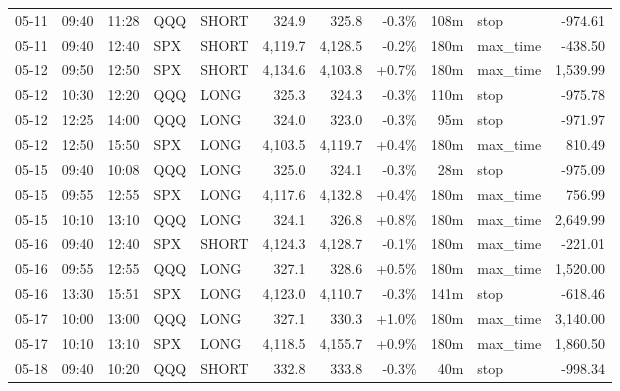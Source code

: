 \documentclass[11pt,a4paper,twoside]{article}
\begin{document}
\begin{center}
\begin{longtable}{>{\color{txtmain}}l l l l l r r r r >{\color{txtmain}}l r}
05-11 & 09:40 & 11:28 & QQQ & SHORT & 324.9 & 325.8 & \textcolor{lossred}{-0.3\%} & 108m & stop & \textcolor{lossred}{-974.61} \\
05-11 & 09:40 & 12:40 & SPX & SHORT & 4,119.7 & 4,128.5 & \textcolor{lossred}{-0.2\%} & 180m & max\_time & \textcolor{lossred}{-438.50} \\
05-12 & 09:50 & 12:50 & SPX & SHORT & 4,134.6 & 4,103.8 & \textcolor{wingreen}{+0.7\%} & 180m & max\_time & \textcolor{wingreen}{1,539.99} \\
05-12 & 10:30 & 12:20 & QQQ & LONG & 325.3 & 324.3 & \textcolor{lossred}{-0.3\%} & 110m & stop & \textcolor{lossred}{-975.78} \\
05-12 & 12:25 & 14:00 & QQQ & LONG & 324.0 & 323.0 & \textcolor{lossred}{-0.3\%} & 95m & stop & \textcolor{lossred}{-971.97} \\
05-12 & 12:50 & 15:50 & SPX & LONG & 4,103.5 & 4,119.7 & \textcolor{wingreen}{+0.4\%} & 180m & max\_time & \textcolor{wingreen}{810.49} \\
05-15 & 09:40 & 10:08 & QQQ & LONG & 325.0 & 324.1 & \textcolor{lossred}{-0.3\%} & 28m & stop & \textcolor{lossred}{-975.09} \\
05-15 & 09:55 & 12:55 & SPX & LONG & 4,117.6 & 4,132.8 & \textcolor{wingreen}{+0.4\%} & 180m & max\_time & \textcolor{wingreen}{756.99} \\
05-15 & 10:10 & 13:10 & QQQ & LONG & 324.1 & 326.8 & \textcolor{wingreen}{+0.8\%} & 180m & max\_time & \textcolor{wingreen}{2,649.99} \\
05-16 & 09:40 & 12:40 & SPX & SHORT & 4,124.3 & 4,128.7 & \textcolor{lossred}{-0.1\%} & 180m & max\_time & \textcolor{lossred}{-221.01} \\
05-16 & 09:55 & 12:55 & QQQ & LONG & 327.1 & 328.6 & \textcolor{wingreen}{+0.5\%} & 180m & max\_time & \textcolor{wingreen}{1,520.00} \\
05-16 & 13:30 & 15:51 & SPX & LONG & 4,123.0 & 4,110.7 & \textcolor{lossred}{-0.3\%} & 141m & stop & \textcolor{lossred}{-618.46} \\
05-17 & 10:00 & 13:00 & QQQ & LONG & 327.1 & 330.3 & \textcolor{wingreen}{+1.0\%} & 180m & max\_time & \textcolor{wingreen}{3,140.00} \\
05-17 & 10:10 & 13:10 & SPX & LONG & 4,118.5 & 4,155.7 & \textcolor{wingreen}{+0.9\%} & 180m & max\_time & \textcolor{wingreen}{1,860.50} \\
05-18 & 09:40 & 10:20 & QQQ & SHORT & 332.8 & 333.8 & \textcolor{lossred}{-0.3\%} & 40m & stop & \textcolor{lossred}{-998.34} \\

\end{longtable}
\end{center}
\end{document}
